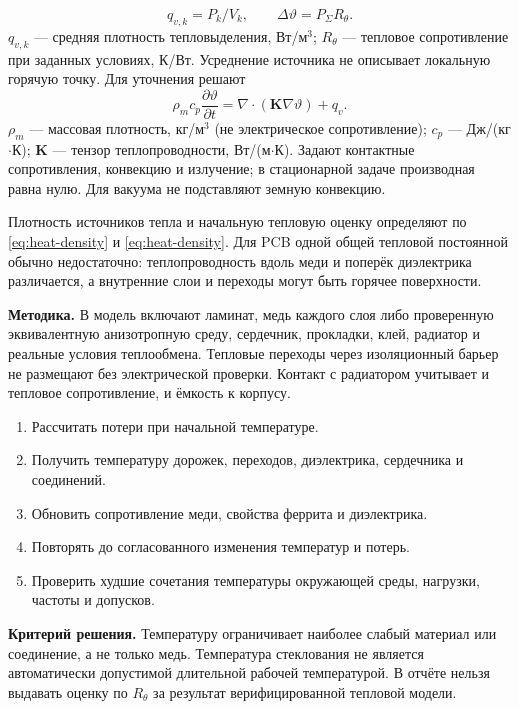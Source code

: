 \documentclass[14pt,a4paper]{extarticle}
\newcommand{\method}{\par\noindent\textbf{Методика.} }
\newcommand{\criterion}{\par\noindent\textbf{Критерий решения.} }
\begin{document}
\begin{equation}
 q_{v,k}=P_k/V_k,\qquad \Delta\vartheta=P_\Sigma R_\theta.
 \label{eq:heat-density}
\end{equation}
$q_{v,k}$ --- средняя плотность тепловыделения, Вт/м$^3$; $R_\theta$ --- тепловое сопротивление при заданных условиях, К/Вт. Усреднение источника не описывает локальную горячую точку. Для уточнения решают
\begin{equation}
 \rho_m c_p\frac{\partial\vartheta}{\partial t}
 =\nabla\cdot(\mathbf K\nabla\vartheta)+q_v.
 \label{eq:thermal-pde}
\end{equation}
$\rho_m$ --- массовая плотность, кг/м$^3$ (не электрическое сопротивление); $c_p$ --- Дж/(кг$\cdot$К); $\mathbf K$ --- тензор теплопроводности, Вт/(м$\cdot$К). Задают контактные сопротивления, конвекцию и излучение; в стационарной задаче производная равна нулю. Для вакуума не подставляют земную конвекцию.

Плотность источников тепла и начальную тепловую оценку определяют по \eqref{eq:heat-density} и \eqref{eq:heat-density}. Для PCB одной общей тепловой постоянной обычно недостаточно: теплопроводность вдоль меди и поперёк диэлектрика различается, а внутренние слои и переходы могут быть горячее поверхности.

\method В модель включают ламинат, медь каждого слоя либо проверенную эквивалентную анизотропную среду, сердечник, прокладки, клей, радиатор и реальные условия теплообмена. Тепловые переходы через изоляционный барьер не размещают без электрической проверки. Контакт с радиатором учитывает и тепловое сопротивление, и ёмкость к корпусу.

\begin{enumerate}
\item Рассчитать потери при начальной температуре.
\item Получить температуру дорожек, переходов, диэлектрика, сердечника и соединений.
\item Обновить сопротивление меди, свойства феррита и диэлектрика.
\item Повторять до согласованного изменения температур и потерь.
\item Проверить худшие сочетания температуры окружающей среды, нагрузки, частоты и допусков.
\end{enumerate}
\criterion Температуру ограничивает наиболее слабый материал или соединение, а не только медь. Температура стеклования не является автоматически допустимой длительной рабочей температурой. В отчёте нельзя выдавать оценку по $R_\theta$ за результат верифицированной тепловой модели.
\end{document}
